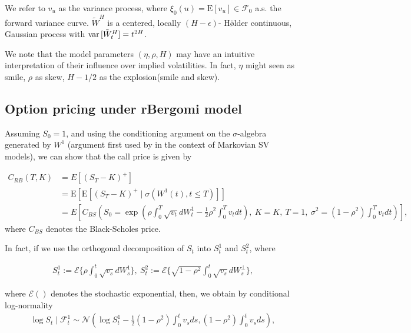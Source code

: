 \documentclass[11pt]{article}
\newcommand{\expt}[1]{\mathrm{E}\left[#1\right]}
\begin{document}
We refer to $v_u$ as the variance process, where $\xi_0(u) = \expt{v_u} \in \mathcal{F}_0$ a.s. the forward variance curve. $\tilde{W}^H $ is a centered, locally $(H-\epsilon)$- H\" \o lder continuous, Gaussian process with $\operatorname{var}{[\tilde{W}^H_t]} = t^{2H}$.




We note that the model parameters $(\eta,\rho,H)$ may have an
 intuitive interpretation of their influence over implied volatilities. In fact,   $\eta$ might seen as  smile, $\rho$ as skew, $H-1/2$ as the explosion(smile and skew).

\subsection{Option pricing under rBergomi model}\label{sec:Option pricing under rBergomi model}

Assuming $S_0 = 1$, and using the conditioning argument on the $\sigma$-algebra generated by $W^1$ (argument first used by \cite{romano1997contingent} in the context of Markovian SV
models), we can  show that the call price is given by

\begin{align}\label{BS_formula_rbergomi}
	C_{RB}\left( T, K \right) &= E\left[ \left(S_T - K \right)^+ \right]  \nonumber\\
	&=\expt{\expt{(S_T-K)^+ \mid \sigma(W^1(t) ,t \le T)}}\nonumber \\
	&=E\left[C_{BS}\left( S_0 = \operatorname{exp}\left(\rho \int_0^T \sqrt{v_t} dW_t^1 - \frac{1}{2}
	\rho^2 \int_0^T v_t dt\right),\ K = K, \ T = 1, \ \sigma^2 = (1-\rho^2)
	\int_0^T v_t dt \right) \right],
\end{align}
where $C_{BS}$ denotes the Black-Scholes price.

In fact, if we use the orthogonal decomposition of $S_t$ into $S_{t}^1$ and $S_{t}^2$, where

\begin{align}
	S_t^1:=\mathcal{E}\{ \rho \int_{0}^{t}  \sqrt{v_s} dW_s^1\}, \: S_t^2:= \mathcal{E}\{ \sqrt{1-\rho^2} \int_{0}^{t}  \sqrt{v_s} dW_s^\perp  \}	,
\end{align}

where $\mathcal{E}()$ denotes the stochastic exponential, then, we obtain by conditional log-normality
\begin{align}
	\log S_t \mid \mathcal{F}_t^1 \sim \mathcal{N}\left( \log S_t^1-\frac{1}{2} (1-\rho^2) \int_{0}^{t} v_s ds , (1-\rho^2) \int_{0}^{t} v_s ds \right),
\end{align} 
\end{document}
